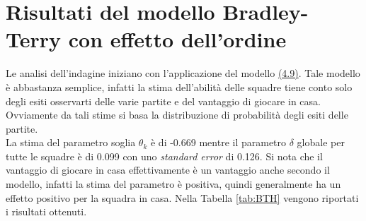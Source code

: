 \section{Risultati del modello Bradley-Terry con effetto dell'ordine}
Le analisi dell'indagine iniziano con l'applicazione del modello \hyperref[for:3.9]{(4.9)}. Tale modello è abbastanza semplice, infatti la stima dell'abilità delle squadre tiene conto solo degli esiti osservarti delle varie partite e del vantaggio di giocare in casa. Ovviamente da tali stime si basa la distribuzione di probabilità degli esiti delle partite.\\
La stima del parametro soglia $\theta_k$ è di -0.669 mentre il parametro $\delta$ globale per tutte le squadre è di 0.099 con uno \emph{standard error} di 0.126. Si nota che il vantaggio di giocare in casa effettivamente è un vantaggio anche secondo il modello, infatti la stima del parametro è positiva, quindi generalmente ha un effetto positivo per la squadra in casa. Nella Tabella \ref{tab:BTH} vengono riportati i risultati ottenuti.

